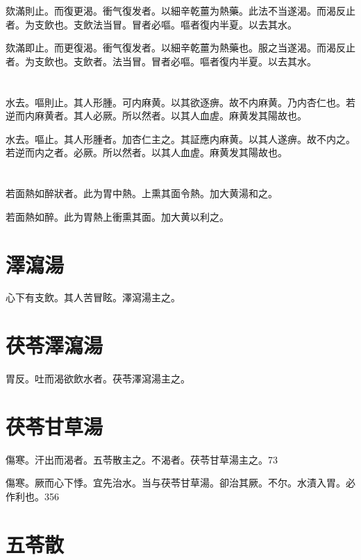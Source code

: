欬滿則止。而復更渴。衝气復发者。以細辛乾薑为熱藥。此法不当遂渴。而渴反止者。为支飲也。支飲法当冒。冒者必嘔。嘔者復内半夏。以去其水。{\wuben}

欬滿即止。而更復渴。衝气復发者。以細辛乾薑为熱藥也。服之当遂渴。而渴反止者。为支飲也。支飲者。法当冒。冒者必嘔。嘔者復内半夏。以去其水。{\dengben}

\section{}

水去。嘔則止。其人形腫。可内麻黄。以其欲逐痹。故不内麻黄。乃内杏仁也。若逆而内麻黄者。其人必厥。所以然者。以其人血虗。麻黄发其陽故也。{\wuben}

水去。嘔止。其人形腫者。加杏仁主之。其証應内麻黄。以其人遂痹。故不内之。若逆而内之者。必厥。所以然者。以其人血虗。麻黄发其陽故也。{\dengben}

\section{}

若面熱如醉狀者。此为胃中熱。上熏其面令熱。加大黄湯和之。{\wuben}

若面熱如醉。此为胃熱上衝熏其面。加大黄以利之。{\dengben}

\section{澤瀉湯}

心下有支飲。其人苦冒眩。澤瀉湯主之。

\section{茯苓澤瀉湯}

胃反。吐而渴欲飲水者。茯苓澤瀉湯主之。

\section{茯苓甘草湯}

傷寒。汗出而渴者。五苓散主之。不渴者。茯苓甘草湯主之。73

傷寒。厥而心下悸。宜先治水。当与茯苓甘草湯。卻治其厥。不尔。水漬入胃。必作利也。356

\section{五苓散}

